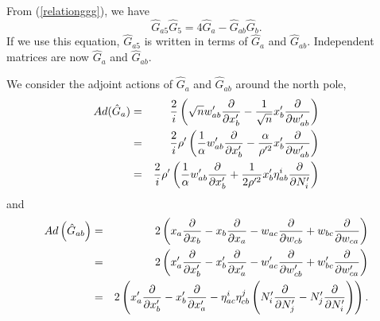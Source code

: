 \documentclass[a4paper,11pt]{article}
\begin{document}
From (\ref{relationggg}), we have 
\begin{equation} 
\hat{G}_{a5}\hat{G}_{5}=4\hat{G}_{a}-\hat{G}_{ab}\hat{G}_{b}. 
\label{g5ga} 
\end{equation} 
If we use this equation, $\hat{G}_{a5}$ is written in terms of 
$\hat{G}_{a}$ and $\hat{G}_{ab}$. 
Independent matrices are now $\hat{G}_{a}$ and $\hat{G}_{ab}$. 

We consider the 
adjoint actions of $\hat{G}_{a}$ and $\hat{G}_{ab}$ 
around the north pole, 
\begin{eqnarray}
Ad(\hat{G}_{a})&=&
\frac{2}{i}\left(
\sqrt{n}w_{ab}^{\prime}
\frac{\partial}{\partial x_{b}^{\prime}}
-\frac{1}{ \sqrt{n}}x_{b}^{\prime}
\frac{\partial}{\partial w_{ab}^{\prime}}
\right) \cr 
&=&
\frac{2}{i}\rho^{\prime}\left(
\frac{1}{\alpha}w_{ab}^{\prime}
\frac{\partial}{\partial x_{b}^{\prime}}
-\frac{\alpha}{\rho^{\prime 2}}x_{b}^{\prime}
\frac{\partial}{\partial w_{ab}^{\prime}}
\right) 
\cr 
&=&
\frac{2}{i}\rho^{\prime}\left(
\frac{1}{\alpha}w_{ab}^{\prime}
\frac{\partial}{\partial x_{b}^{\prime}}
+\frac{1}{2\rho^{\prime 2}}x_{b}^{\prime}\eta_{ab}^{i}
\frac{\partial}{\partial N_{i}^{\prime}}
\right) 
\end{eqnarray}
and 
\begin{eqnarray}
Ad\left(\hat{G}_{ab} \right)&=&2\left(
x_{a}\frac{\partial}{\partial x_{b}}
-x_{b}\frac{\partial}{\partial x_{a}}
-w_{ac}\frac{\partial}{\partial w_{cb}}
+w_{bc}\frac{\partial}{\partial w_{ca}}
\right) \cr 
&=&2\left(
x_{a}^{\prime}\frac{\partial}{\partial x_{b}^{\prime}}
-x_{b}^{\prime}\frac{\partial}{\partial x_{a}^{\prime}}
-w_{ac}^{\prime}\frac{\partial}{\partial w_{cb}^{\prime}}
+w_{bc}^{\prime}\frac{\partial}{\partial w_{ca}^{\prime}}
\right) \cr 
&=&2\left(
x_{a}^{\prime}\frac{\partial}{\partial x_{b}^{\prime}}
-x_{b}^{\prime}\frac{\partial}{\partial x_{a}^{\prime}}
-\eta_{ac}^{i}\eta_{cb}^{j}
\left(N_{i}^{\prime}\frac{\partial}{\partial N_{j}^{\prime}}-
N_{j}^{\prime}\frac{\partial}{\partial N_{i}^{\prime}}\right)
\right)  .
\end{eqnarray}
\end{document}
